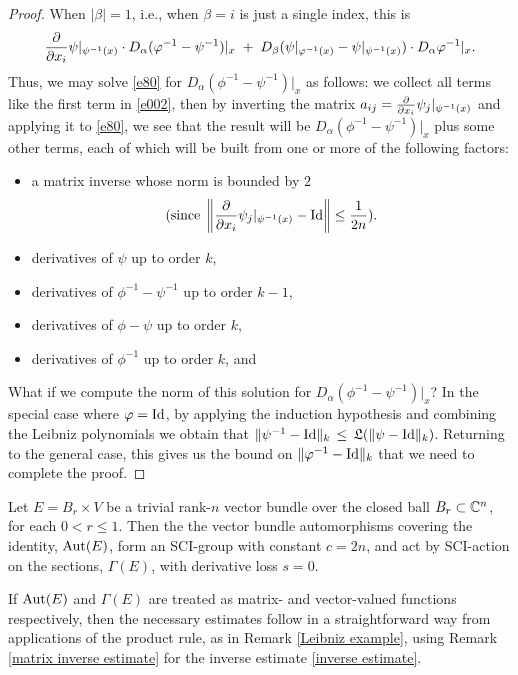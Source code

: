 \documentclass{article}
\begin{document}
\begin{proof}
When $|\beta|=1$, i.e., when $\beta=i$ is just a single index, this is
\begin{equation}\label{e002}
\frac{\del}{\del x_i} \psi|_{\psi^{-1}(x)} \cdot D_\alpha(\phi^{-1}-\psi^{-1})|_x \;+\; D_\beta(\psi|_{\phi^{-1}(x)} - \psi|_{\psi^{-1}(x)})\cdot D_\alpha\phi^{-1}|_x.
\end{equation}
Thus, we may solve \eqref{e80} for $D_\alpha(\phi^{-1}-\psi^{-1})|_x$ as follows: we collect all terms like the first term in \eqref{e002}, then by inverting the matrix $a_{ij}=\frac{\partial}{\partial x_i} \psi_j|_{\psi^{-1}(x)}$ and applying it to \eqref{e80}, we see that the result will be $D_\alpha(\phi^{-1}-\psi^{-1})|_x$ plus some other terms, each of which will be built from one or more of the following factors:
\begin{itemize}
\item a matrix inverse whose norm is bounded by $2$
$$(\textnormal{since}\; \left\|\frac{\partial}{\partial x_i} \psi_j|_{\psi^{-1}(x)}-\textrm{Id}\right\| \leq \frac{1}{2n}).$$
\item derivatives of $\psi$ up to order $k$,
\item derivatives of $\phi^{-1}-\psi^{-1}$ up to order $k-1$,
\item derivatives of $\phi-\psi$ up to order $k$,
\item derivatives of $\phi^{-1}$ up to order $k$, and
\end{itemize}

What if we compute the norm of this solution for $D_\alpha(\phi^{-1}-\psi^{-1})|_x$?  In the special case where $\varphi=\textrm{Id}$, by applying the induction hypothesis and combining the Leibniz polynomials we obtain that $\|\psi^{-1}-\textrm{Id}\|_k \,\leq\, \mathfrak{L}(\|\psi-\textrm{Id}\|_k)$.   Returning to the general case, this gives us the bound on $\|\varphi^{-1}-\textrm{Id}\|_k$ that we need to complete the proof.
\end{proof}

\begin{lem}\label{vector bundle is SCI}
Let $E=B_r \times V$ be a trivial rank-$n$ vector bundle over the closed ball $B_r \subset \mathbb C^n$, for each $0<r\leq1$.  Then the the vector bundle automorphisms covering the identity, $\textrm{Aut}(E)$, form an SCI-group with constant $c=2n$, and act by SCI-action on the sections, $\Gamma(E)$, with derivative loss $s=0$.
\end{lem}
If $\textrm{Aut}(E)$ and $\Gamma(E)$ are treated as matrix- and vector-valued functions respectively, then the necessary estimates follow in a straightforward way from applications of the product rule, as in Remark \ref{Leibniz example}, using Remark \ref{matrix inverse estimate} for the inverse estimate \eqref{inverse estimate}.
\end{document}
